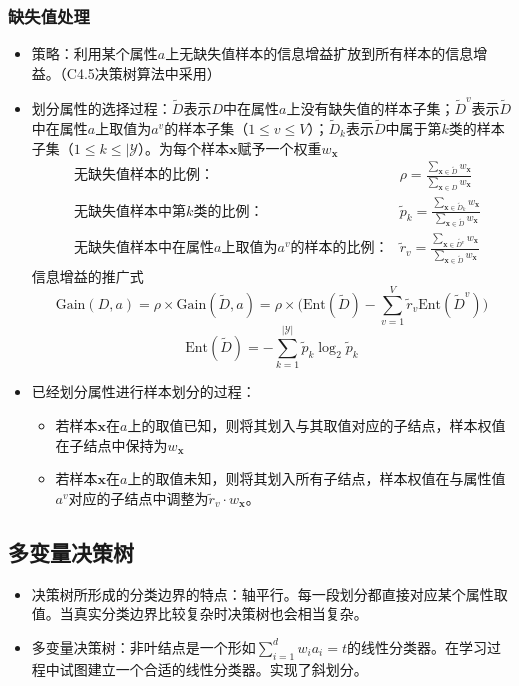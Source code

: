 \documentclass{ctexart}
\begin{document}
					\subsubsection{缺失值处理}
						\begin{itemize}
							\item 策略：利用某个属性$a$上无缺失值样本的信息增益扩放到所有样本的信息增益。（C4.5决策树算法中采用）
							\item 划分属性的选择过程：$\tilde{D}$表示$D$中在属性$a$上没有缺失值的样本子集；$\tilde{D}^v$表示$\tilde{D}$中在属性$a$上取值为$a^v$的样本子集（$1\le v\le V$）；$\tilde{D}_k$表示$\tilde{D}$中属于第$k$类的样本子集（$1\le k\le|\mathcal{Y}$）。为每个样本$\bm{x}$赋予一个权重$w_{\bm{x}}$\begin{align*}
								& \textrm{无缺失值样本的比例：} & \rho=\frac{\sum_{\bm{x}\in\tilde{D}}^{}w_{\bm{x}}}{\sum_{\bm{x}\in D}^{}w_{\bm{x}}}\\
								& \textrm{无缺失值样本中第$k$类的比例：} & \tilde{p}_k=\frac{\sum_{\bm{x}\in\tilde{D}_k}^{}w_{\bm{x}}}{\sum_{\bm{x}\in\tilde{D}}^{}w_{\bm{x}}}\\
								& \textrm{无缺失值样本中在属性$a$上取值为$a^v$的样本的比例：} & \tilde{r}_v=\frac{\sum_{\bm{x}\in\tilde{D^v}}^{}w_{\bm{x}}}{\sum_{\bm{x}\in\tilde{D}}w_{\bm{x}}}
							\end{align*}
							信息增益的推广式\[\mathrm{Gain}(D,a)=\rho\times\mathrm{Gain}(\tilde{D},a)=\rho\times\big(\mathrm{Ent}(\tilde{D})-\sum_{v=1}^{V}\tilde{r}_v\mathrm{Ent}(\tilde{D}^v)\big)\]\[\mathrm{Ent}(\tilde{D})=-\sum_{k=1}^{|\mathcal{Y}|}\tilde{p}_k\log_2\tilde{p}_k\]
							\item 已经划分属性进行样本划分的过程：\begin{itemize}
								\item 若样本$\bm{x}$在$a$上的取值已知，则将其划入与其取值对应的子结点，样本权值在子结点中保持为$w_{\bm{x}}$
								\item 若样本$\bm{x}$在$a$上的取值未知，则将其划入所有子结点，样本权值在与属性值$a^v$对应的子结点中调整为$\tilde{r}_v\cdot w_{\bm{x}}$。
							\end{itemize}
						\end{itemize}
				\subsection{多变量决策树}
					\begin{itemize}
						\item 决策树所形成的分类边界的特点：轴平行。每一段划分都直接对应某个属性取值。当真实分类边界比较复杂时决策树也会相当复杂。
						\item 多变量决策树：非叶结点是一个形如$\sum_{i=1}^{d}w_ia_i=t$的线性分类器。在学习过程中试图建立一个合适的线性分类器。实现了斜划分。
					\end{itemize}
\end{document}
